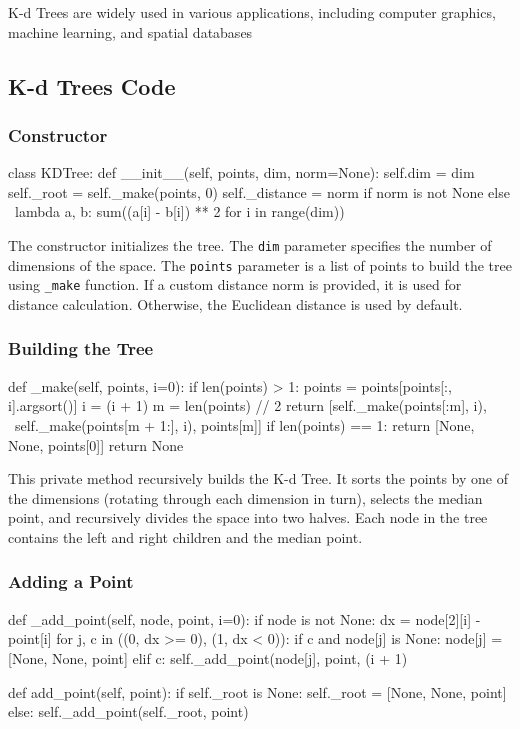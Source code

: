 \documentclass{article}
\begin{document}
	 K-d Trees are widely used in various applications, including computer graphics, machine learning, and spatial databases
	

	\subsection{K-d Trees Code}
	
	\subsubsection{Constructor}
	\begin{python}
class KDTree:
	def __init__(self, points, dim, norm=None):
		self.dim = dim
		self._root = self._make(points, 0)
		self._distance = norm if norm is not None else \
			lambda a, b: sum((a[i] - b[i]) ** 2 for i in range(dim))
	\end{python}
	
	The constructor initializes the tree. The \texttt{dim} parameter specifies the number of dimensions of the space. The \texttt{points} parameter is a list of points to build the tree using \texttt{\_make} function. If a custom distance norm is provided, it is used for distance calculation. Otherwise, the Euclidean distance is used by default.
	
	\subsubsection{Building the Tree}
	\begin{python}
def _make(self, points, i=0):
	if len(points) > 1:
		points = points[points[:, i].argsort()] 
		i = (i + 1) %
		m = len(points) // 2
		return [self._make(points[:m], i), \
							self._make(points[m + 1:], i), points[m]]		
	if len(points) == 1:
		return [None, None, points[0]]
	return None
	\end{python}
	
	This private method recursively builds the K-d Tree. It sorts the points by one of the dimensions (rotating through each dimension in turn), selects the median point, and recursively divides the space into two halves. Each node in the tree contains the left and right children and the median point.
	
	\subsubsection{Adding a Point}
	\begin{python}
def _add_point(self, node, point, i=0):
	if node is not None:
		dx = node[2][i] - point[i]
		for j, c in ((0, dx >= 0), (1, dx < 0)):
			if c and node[j] is None:
				node[j] = [None, None, point]
			elif c:
				self._add_point(node[j], point, (i + 1) %
		
def add_point(self, point):
	if self._root is None:
		self._root = [None, None, point]
	else:
		self._add_point(self._root, point)
	\end{python}
	
\end{document}

